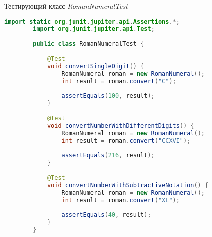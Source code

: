 \begin{ListingEnv}[!h]%
	\captiondelim{ } %
	\caption{Тестирующий класс \textit{RomanNumeralTest}}
	\begin{lstlisting}[language={Java}]
		import static org.junit.jupiter.api.Assertions.*;
		import org.junit.jupiter.api.Test;
		
		public class RomanNumeralTest {
			
			@Test
			void convertSingleDigit() {
				RomanNumeral roman = new RomanNumeral();
				int result = roman.convert("C");
				
				assertEquals(100, result);
			}
			
			@Test
			void convertNumberWithDifferentDigits() {
				RomanNumeral roman = new RomanNumeral();
				int result = roman.convert("CCXVI");
				
				assertEquals(216, result);
			}
			
			@Test
			void convertNumberWithSubtractiveNotation() {
				RomanNumeral roman = new RomanNumeral();
				int result = roman.convert("XL");
				
				assertEquals(40, result);
			}
		}
	\end{lstlisting}
\end{ListingEnv}

